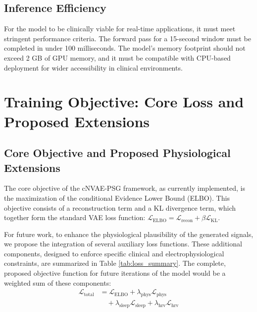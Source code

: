 \documentclass[11pt,en]{elegantpaper}
\begin{document}
\subsection{Inference Efficiency}
For the model to be clinically viable for real-time applications, it must meet stringent performance criteria. The forward pass for a 15-second window must be completed in under 100 milliseconds. The model's memory footprint should not exceed 2 GB of GPU memory, and it must be compatible with CPU-based deployment for wider accessibility in clinical environments.

\section{Training Objective: Core Loss and Proposed Extensions}

\subsection{Core Objective and Proposed Physiological Extensions}

The core objective of the cNVAE-PSG framework, as currently implemented, is the maximization of the conditional Evidence Lower Bound (ELBO). This objective consists of a reconstruction term and a KL divergence term, which together form the standard VAE loss function: $\mathcal{L}_{\text{ELBO}} = \mathcal{L}_{\text{recon}} + \beta \mathcal{L}_{\text{KL}}$.

For future work, to enhance the physiological plausibility of the generated signals, we propose the integration of several auxiliary loss functions. These additional components, designed to enforce specific clinical and electrophysiological constraints, are summarized in Table \ref{tab:loss_summary}. The complete, proposed objective function for future iterations of the model would be a weighted sum of these components:
\begin{align}
\mathcal{L}_{\text{total}} &= \mathcal{L}_{\text{ELBO}} + \lambda_{\text{phys}} \mathcal{L}_{\text{phys}} \\
&\quad + \lambda_{\text{sleep}} \mathcal{L}_{\text{sleep}} + \lambda_{\text{hrv}} \mathcal{L}_{\text{hrv}}
\end{align}
\end{document}
